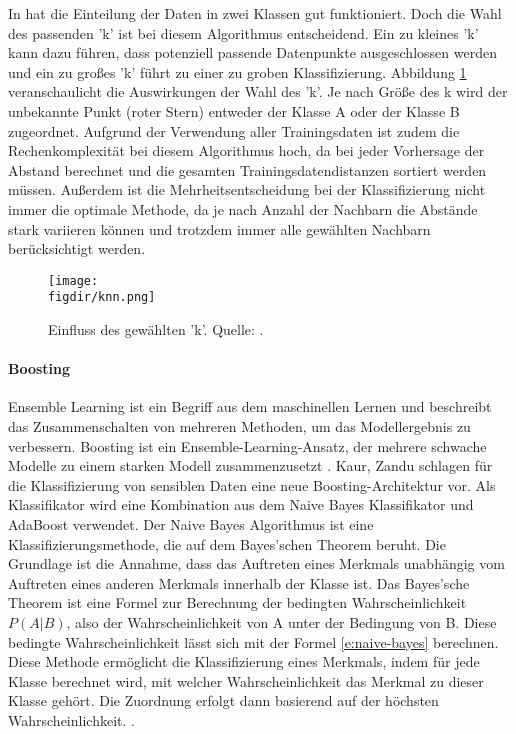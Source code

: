 In \cite{Zardari.2014} hat die Einteilung der Daten in zwei Klassen gut funktioniert. Doch die Wahl des passenden 'k' ist bei diesem Algorithmus entscheidend. Ein zu kleines 'k' kann dazu führen, dass potenziell passende Datenpunkte ausgeschlossen werden und ein zu großes 'k' führt zu einer zu groben Klassifizierung. Abbildung \ref{f:knn} veranschaulicht die Auswirkungen der Wahl des 'k'. Je nach Größe des k wird der unbekannte Punkt (roter Stern) entweder der Klasse A oder der Klasse B zugeordnet. Aufgrund der Verwendung aller Trainingsdaten ist zudem die Rechenkomplexität bei diesem Algorithmus hoch, da bei jeder Vorhersage der Abstand berechnet und die gesamten Trainingsdatendistanzen sortiert werden müssen. Außerdem ist die Mehrheitsentscheidung bei der Klassifizierung nicht immer die optimale Methode, da je nach Anzahl der Nachbarn die Abstände stark variieren können und trotzdem immer alle gewählten Nachbarn berücksichtigt werden.

\begin{figure}[htbp]
    \centering
    \texttt{[image: \\figdir/knn.png]}
    \caption{Einfluss des gewählten 'k'. Quelle: \cite{Shah.03.03.2021}.}
    \label{f:knn}
\end{figure}


\paragraph{Boosting}
Ensemble Learning ist ein Begriff aus dem maschinellen Lernen und beschreibt das Zusammenschalten von mehreren Methoden, um das Modellergebnis zu verbessern. Boosting ist ein Ensemble-Learning-Ansatz, der mehrere schwache Modelle zu einem starken Modell zusammenzusetzt \cite{Frochte.2018c}.
Kaur, Zandu \cite{Kaur.2016} schlagen für die Klassifizierung von sensiblen Daten eine neue Boosting-Architektur vor. Als Klassifikator wird eine Kombination aus dem Naive Bayes Klassifikator und AdaBoost verwendet. Der Naive Bayes Algorithmus ist eine Klassifizierungsmethode, die auf dem  Bayes'schen Theorem beruht. Die Grundlage ist die Annahme, dass das Auftreten eines Merkmals unabhängig vom Auftreten eines anderen Merkmals innerhalb der Klasse ist. Das  Bayes'sche Theorem ist eine Formel zur Berechnung der bedingten Wahrscheinlichkeit ${P(A|B)}$, also der Wahrscheinlichkeit von A unter der Bedingung von B. Diese bedingte Wahrscheinlichkeit lässt sich mit der Formel \ref{e:naive-bayes} berechnen. Diese Methode ermöglicht die Klassifizierung eines Merkmals, indem für jede Klasse berechnet wird, mit welcher Wahrscheinlichkeit das Merkmal zu dieser Klasse gehört. Die Zuordnung erfolgt dann basierend auf der höchsten Wahrscheinlichkeit. \cite{Frochte.2018d}.

